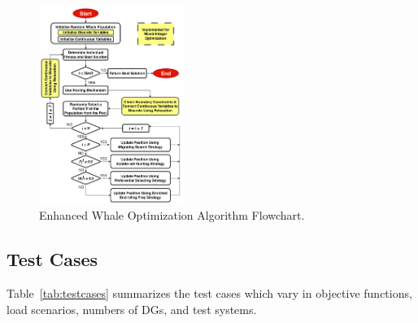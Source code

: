\documentclass[conference]{IEEEtran}
\begin{document}
\begin{figure}[htbp]
	\centerline{\includegraphics[width=0.42\textwidth]{EWOAflowchart.png}}
	\vspace{-5pt}
	\caption{Enhanced Whale Optimization Algorithm Flowchart.}
	\vspace{-10pt}
	\label{fig:EWOAflowchart}
\end{figure}

\subsection{Test Cases}

Table~\ref{tab:testcases} summarizes the test cases which vary in objective functions, load scenarios, numbers of DGs, and test systems.
\end{document}
